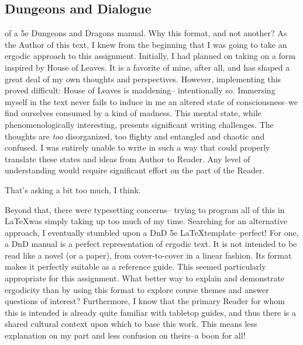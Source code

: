 \documentclass[10pt,twoside,twocolumn,openany,nomultitoc]{book}
\begin{document}
\subsection{Dungeons and Dialogue}
 of a 5e Dungeons and Dragons manual. Why this format, and not another? As the Author of this text, I knew from the beginning that I was going to take an ergodic approach to this assignment. Initially, I had planned on taking on a form inspired by \color{blue}House \color{black} of Leaves. It is a favorite of mine, after all, and has shaped a great deal of my own thoughts and perspectives. However, implementing this proved difficult:  \color{blue}House  \color{black}of Leaves is maddening-- intentionally so.  Immersing myself in the text never fails to induce in me an altered state of consciousness--we find ourselves consumed by a kind of madness. This mental state, while phenomenologically interesting, presents significant writing challenges. The thoughts are \textit{too} disorganized, too flighty and entangled and chaotic and confused. I was entirely unable to write in such a way that could properly translate these states and ideas from Author to Reader. Any level of understanding would require significant effort on the part of the Reader. \\\vspace{6pt}

    That's asking a bit too much, I think. \\\vspace{6pt}

Beyond that, there were typesetting concerns-- trying to program all of this in \LaTeX  was simply taking up too much of my time. Searching for an alternative approach, I eventually stumbled upon a DnD 5e  \LaTeX  template--perfect! For one, a DnD manual is a perfect representation of ergodic text. It is not intended to be read like a novel (or a paper), from cover-to-cover in a linear fashion. Its format makes it perfectly suitable as a reference guide. This seemed particularly appropriate for this assignment.  What better way to explain and demonstrate ergodicity than by using this format to explore course themes and answer questions of interest?  Furthermore, I know that the primary Reader for whom this is intended is already quite familiar with tabletop guides, and thus there is a shared cultural context upon which to base this work. This means less explanation on my part and less confusion on theirs--a boon for all!\\
     
\end{document}
